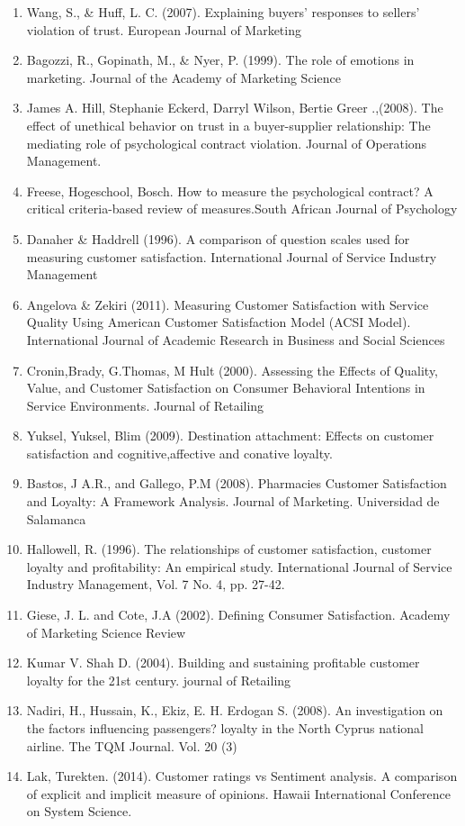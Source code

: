\documentclass[a4paper, 12pt]{extarticle}
\begin{document}
{\begin{enumerate}
\item Wang, S., \& Huff, L. C. (2007). Explaining buyers' responses to sellers' violation of trust. European Journal of Marketing%
\item Bagozzi, R., Gopinath, M., \& Nyer, P. (1999). The role of emotions in marketing. Journal of the Academy of Marketing Science%
\item James A. Hill, Stephanie Eckerd, Darryl Wilson, Bertie Greer .,(2008). The effect of unethical behavior on trust in a buyer-supplier relationship: The mediating role of psychological contract violation. Journal of Operations Management.%
\item Freese, Hogeschool, Bosch. How to measure the psychological contract? A critical criteria-based review of measures.South African Journal of Psychology
\item Danaher \& Haddrell (1996). A comparison of question scales used for measuring customer satisfaction. International Journal of Service Industry Management
\item  Angelova \& Zekiri (2011). Measuring Customer Satisfaction with Service Quality Using American Customer Satisfaction Model (ACSI Model). International Journal of Academic Research in Business and Social Sciences 
\item Cronin,Brady, G.Thomas, M Hult (2000). Assessing the Effects of Quality, Value, and Customer Satisfaction on Consumer Behavioral Intentions in Service Environments. Journal of Retailing 
\item Yuksel, Yuksel, Blim (2009). Destination attachment: Effects on customer satisfaction and cognitive,affective and conative loyalty.
\item Bastos, J A.R., and Gallego, P.M (2008). Pharmacies Customer Satisfaction and Loyalty: A Framework Analysis. Journal of Marketing. Universidad de Salamanca
\item Hallowell, R. (1996). The relationships of customer satisfaction, customer loyalty and profitability: An empirical study. International Journal of Service Industry Management, Vol. 7 No. 4, pp. 27-42.
\item Giese, J. L. and Cote, J.A (2002). Defining Consumer Satisfaction. Academy of Marketing Science Review
\item Kumar V. Shah D. (2004). Building and sustaining profitable customer loyalty for the 21st century. journal of Retailing
\item Nadiri, H., Hussain, K., Ekiz, E. H. Erdogan S. (2008). An investigation on the factors influencing passengers? loyalty in the North Cyprus national airline. The TQM Journal. Vol. 20 (3)
\item Lak, Turekten. (2014). Customer ratings vs Sentiment analysis. A comparison of explicit and implicit measure of opinions. Hawaii International Conference on System Science.
\end{enumerate}
}
\end{document}
